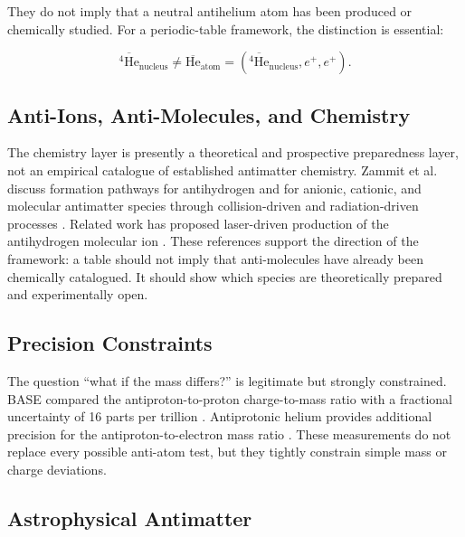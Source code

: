 \documentclass[11pt,a4paper]{article}
\newcommand{\antiHe}{\ensuremath{\overline{\mathrm{He}}}}
\begin{document}
They do not imply that a neutral antihelium atom has been produced or chemically studied. For a periodic-table framework, the distinction is essential:

\begin{equation}
\overline{{}^{4}\mathrm{He}}_{\mathrm{nucleus}}
\neq
\antiHe_{\mathrm{atom}}
=
\left(\overline{{}^{4}\mathrm{He}}_{\mathrm{nucleus}},e^{+},e^{+}\right).
\end{equation}

\subsection{Anti-Ions, Anti-Molecules, and Chemistry}

The chemistry layer is presently a theoretical and prospective preparedness layer, not an empirical catalogue of established antimatter chemistry. Zammit et al. discuss formation pathways for antihydrogen and for anionic, cationic, and molecular antimatter species through collision-driven and radiation-driven processes \cite{Zammit2025}. Related work has proposed laser-driven production of the antihydrogen molecular ion \cite{Zammit2019}. These references support the direction of the framework: a table should not imply that anti-molecules have already been chemically catalogued. It should show which species are theoretically prepared and experimentally open.

\subsection{Precision Constraints}

The question \enquote{what if the mass differs?} is legitimate but strongly constrained. BASE compared the antiproton-to-proton charge-to-mass ratio with a fractional uncertainty of 16 parts per trillion \cite{Borchert2022}. Antiprotonic helium provides additional precision for the antiproton-to-electron mass ratio \cite{Hori2011}. These measurements do not replace every possible anti-atom test, but they tightly constrain simple mass or charge deviations.

\subsection{Astrophysical Antimatter}
\end{document}
